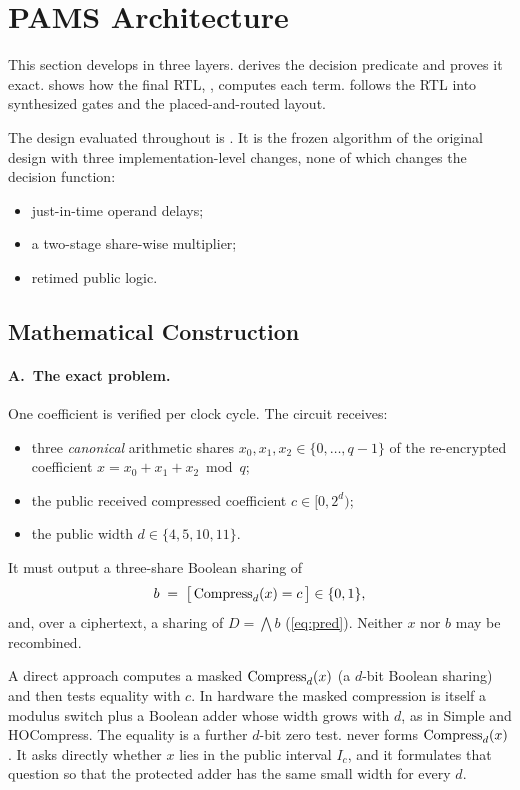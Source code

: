 \section{PAMS Architecture}\label{sec:arch}

This section develops \PAMS{} in three layers.  derives the decision predicate and proves it exact.  shows how the final RTL, , computes each term.  follows the RTL into synthesized gates and the placed-and-routed layout.

The design evaluated throughout is . It is the frozen \PAMS{} algorithm of the original design  with three implementation-level changes, none of which changes the decision function:
\begin{itemize}
  \item just-in-time operand delays;
  \item a two-stage share-wise multiplier;
  \item retimed public logic.
\end{itemize}

\subsection{Mathematical Construction}\label{sec:math}

\paragraph{A.~The exact problem.}
One coefficient is verified per clock cycle. The circuit receives:
\begin{itemize}
  \item three \emph{canonical} arithmetic shares $x_0, x_1, x_2 \in \{0, \dots, q-1\}$ of the re-encrypted coefficient $x = x_0 + x_1 + x_2 \bmod q$;
  \item the public received compressed coefficient $c \in [0, 2^d)$;
  \item the public width $d \in \{4, 5, 10, 11\}$.
\end{itemize}
It must output a three-share Boolean sharing of
\begin{equation}\label{eq:target}
  b \;=\; \bigl[\, \operatorname{Compress}_d(x) = c \,\bigr] \in \{0,1\},
\end{equation}
and, over a ciphertext, a sharing of $D = \bigwedge b$ (\cref{eq:pred}). Neither $x$ nor $b$ may be recombined.

A direct approach computes a masked $\operatorname{Compress}_d(x)$ (a $d$-bit Boolean sharing) and then tests equality with $c$. In hardware the masked compression is itself a modulus switch plus a Boolean adder whose width grows with $d$, as in Simple and HOCompress. The equality is a further $d$-bit zero test. \PAMS{} never forms $\operatorname{Compress}_d(x)$. It asks directly whether $x$ lies in the public interval $I_c$, and it formulates that question so that the protected adder has the same small width for every $d$.


